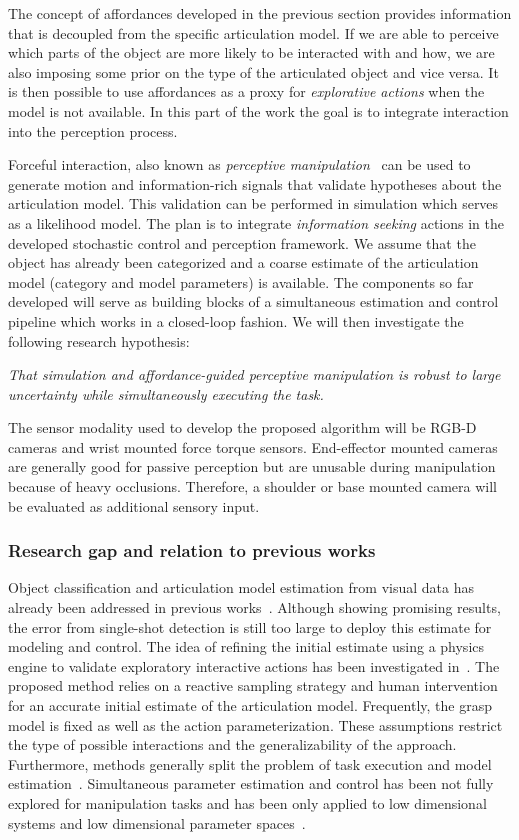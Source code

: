 The concept of affordances developed in the previous section provides information that is decoupled from the specific articulation model. If we are able to perceive which parts of the object are more likely to be interacted with and how, we are also imposing some prior on the type of the articulated object and vice versa. It is then possible to use affordances as a proxy for \emph{explorative actions} when the model is not available. In this part of the work the goal is to integrate interaction into the perception process.

Forceful interaction, also known as \emph{perceptive manipulation}~\cite{bohg2017interactive} can be used to generate motion and information-rich signals that validate hypotheses about the articulation model. This validation can be performed in simulation which serves as a likelihood model. The plan is to integrate \emph{information seeking} actions in the developed stochastic control and perception framework. We assume that the object has already been categorized and a coarse estimate of the articulation model (category and model parameters) is available. The components so far developed will serve as building blocks of a simultaneous estimation and control pipeline which works in a closed-loop fashion. We will then investigate the following research hypothesis:
\begin{displayquote}
\textit{That simulation and affordance-guided perceptive manipulation is robust to large uncertainty while simultaneously executing the task.} 
\end{displayquote}
The sensor modality used to develop the proposed algorithm will be RGB-D cameras and wrist mounted force torque sensors. End-effector mounted cameras are generally good for passive perception but are unusable during manipulation because of heavy occlusions. Therefore, a shoulder or base mounted camera will be evaluated as additional sensory input.  
 
\subsubsection{Research gap and relation to previous works}
Object classification and articulation model estimation from visual data has already been addressed in previous works~\cite{he2017mask, li2020category}. Although showing promising results, the error from single-shot detection is still too large to deploy this estimate for modeling and control. The idea of refining the initial estimate using a physics engine to validate exploratory interactive actions has been investigated in~\cite{eppner2018physics}. The proposed method relies on a reactive sampling strategy and human intervention for an accurate initial estimate of the articulation model. Frequently, the grasp model is fixed as well as the action parameterization. These assumptions restrict the type of possible interactions and the generalizability of the approach. Furthermore, methods generally split the problem of task execution and model estimation~\cite{eppner2018physics}. Simultaneous parameter estimation and control has been not fully explored for manipulation tasks and has been only applied to low dimensional systems and low dimensional parameter spaces~\cite{barcelos2021dual}. 